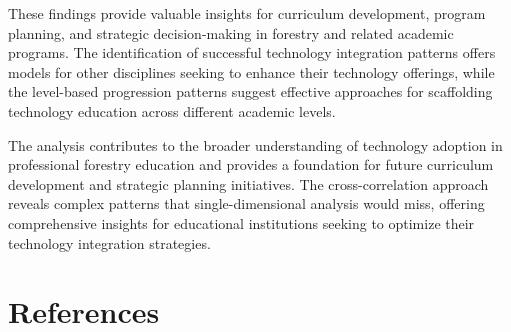 \documentclass[12pt]{article}
\begin{document}
These findings provide valuable insights for curriculum development, program planning, and strategic decision-making in forestry and related academic programs. The identification of successful technology integration patterns offers models for other disciplines seeking to enhance their technology offerings, while the level-based progression patterns suggest effective approaches for scaffolding technology education across different academic levels.

The analysis contributes to the broader understanding of technology adoption in professional forestry education and provides a foundation for future curriculum development and strategic planning initiatives. The cross-correlation approach reveals complex patterns that single-dimensional analysis would miss, offering comprehensive insights for educational institutions seeking to optimize their technology integration strategies.

\section{References}



\end{document}
